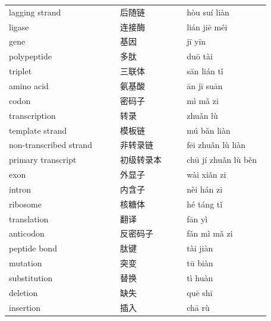 \documentclass[11pt]{article}
\begin{document}
\begin{longtable}{@{}p{0.40\linewidth}p{0.24\linewidth}p{0.30\linewidth}@{}}
lagging strand & 后随链 & hòu suí liàn \\
ligase & 连接酶 & lián jiē méi \\
gene & 基因 & jī yīn \\
polypeptide & 多肽 & duō tài \\
triplet & 三联体 & sān lián tǐ \\
amino acid & 氨基酸 & ān jī suān \\
codon & 密码子 & mì mǎ zi \\
transcription & 转录 & zhuǎn lù \\
template strand & 模板链 & mú bǎn liàn \\
non-transcribed strand & 非转录链 & fēi zhuǎn lù liàn \\
primary transcript & 初级转录本 & chū jí zhuǎn lù běn \\
exon & 外显子 & wài xiǎn zi \\
intron & 内含子 & nèi hán zi \\
ribosome & 核糖体 & hé táng tǐ \\
translation & 翻译 & fān yì \\
anticodon & 反密码子 & fǎn mì mǎ zi \\
peptide bond & 肽键 & tài jiàn \\
mutation & 突变 & tū biàn \\
substitution & 替换 & tì huàn \\
deletion & 缺失 & quē shī \\
insertion & 插入 & chā rù \\
\end{longtable}
\end{document}

